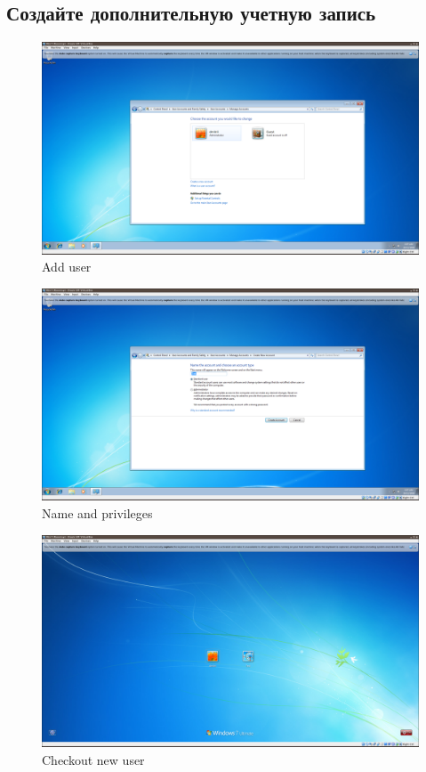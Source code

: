 \documentclass[a4paper]{article}
\begin{document}
\subsection{Создайте дополнительную учетную запись}
\begin{figure}[H]
    \centering
    \includegraphics[width=\linewidth]{52.png}
    \caption{Add user}
\end{figure}

\begin{figure}[H]
    \centering
    \includegraphics[width=\linewidth]{53.png}
    \caption{Name and privileges}
\end{figure}

\begin{figure}[H]
    \centering
    \includegraphics[width=\linewidth]{54.png}
    \caption{Checkout new user}
\end{figure}
\end{document}
